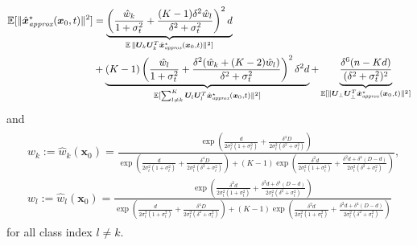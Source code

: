 \begin{lemma}
    \begin{align} \label{eq:bin_overall}
        \begin{split}
        \operatorname{\mathbb{E}}[\|\hat{\bm x}_{\textit{approx}}^{\star}(\bm x_0, t)\|^2] &= \underbrace{\left( \frac{\hat{w}_k}{1 + \sigma_t^2} + \frac{(K-1)\delta^2\hat{w}_l}{\delta^2+\sigma_t^2}\right)^2 d}_{\operatorname{\mathbb{E}}\|\bm U_k \bm U_k^T\hat{\bm x}_{\textit{approx}}^{\star}(\bm x_0, t)\|^2]} \\
        &+ \underbrace{\left( K-1 \right)\left( \frac{\hat{w}_l}{1+\sigma_t^2} + \frac{\delta^2(\hat{w}_k + (K-2)\hat{w}_l)}{\delta^2 + \sigma_t^2} \right)^2 \delta^2 d}_{\operatorname{\mathbb{E}}[\sum_{l \neq k}^K\bm U_l \bm U_l^T\hat{\bm x}_{\textit{approx}}^{\star}(\bm x_0, t)\|^2]} + \underbrace{\frac{\delta^6 (n-Kd)}{(\delta^2 + \sigma_t^2)^2}}_{\operatorname{\mathbb{E}}[\|\bm U_{\perp} \bm U_{\perp}^T\hat{\bm x}_{\textit{approx}}^{\star}(\bm x_0, t)\|^2]} 
        \end{split}
    \end{align}
    and 
    \begin{align}
    \begin{split}
        &\hat{w}_k := \hat{w}_k(\bm x_0) = \frac{\exp\left(\frac{d}{2\sigma_t^2(1 + \sigma_t^2)} + \frac{\delta^4D}{2\sigma_t^2(\delta^2 + \sigma_t^2)} \right)}{\exp\left(\frac{d}{2\sigma_t^2(1 + \sigma_t^2)} + \frac{\delta^4D}{2\sigma_t^2(\delta^2 + \sigma_t^2)} \right) + \left(K-1\right)\exp\left(\frac{\delta^2 d}{2\sigma_t^2(1 + \sigma_t^2)} + \frac{\delta^2 d + \delta^4(D-d)}{2\sigma_t^2(\delta^2 + \sigma_t^2)}\right)}, \\ 
        &\hat{w}_l := \hat{w}_l(\bm x_0) = \frac{\exp\left(\frac{\delta^2 d}{2\sigma_t^2(1 + \sigma_t^2)} + \frac{\delta^2 d + \delta^4(D-d)}{2\sigma_t^2(\delta^2 + \sigma_t^2)}\right)}{\exp\left(\frac{d}{2\sigma_t^2(1 + \sigma_t^2)} + \frac{\delta^4D}{2\sigma_t^2(\delta^2 + \sigma_t^2)} \right) + \left(K-1 \right)\exp\left(\frac{\delta^2 d}{2\sigma_t^2(1 + \sigma_t^2)} + \frac{\delta^2 d + \delta^4(D-d)}{2\sigma_t^2(\delta^2 + \sigma_t^2)}\right)}
    \end{split}
    \end{align}
    for all class index $l \neq k$.
\end{lemma}

